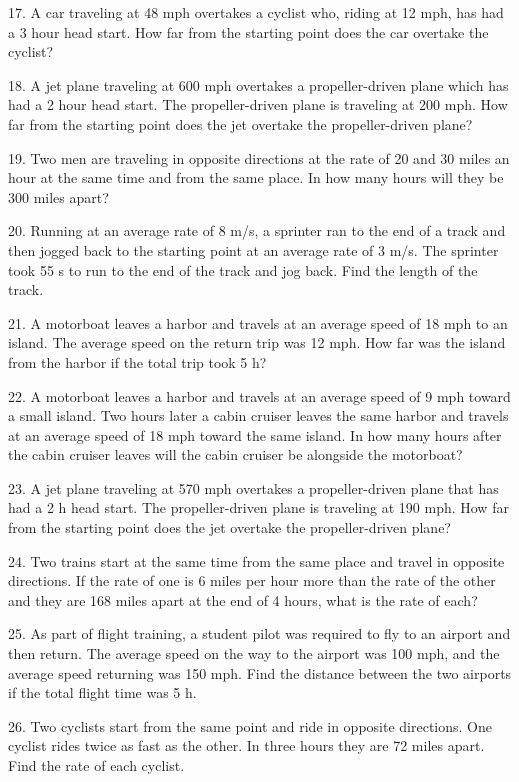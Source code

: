 17. A car traveling at 48 mph overtakes a cyclist who, riding at 12 mph, has
had a 3 hour head start. How far from the starting point does
the car overtake the cyclist?

18. A jet plane traveling at 600 mph overtakes a propeller-driven plane which
has had a 2 hour head start. The propeller-driven plane is
traveling at 200 mph. How far from the starting point does the
jet overtake the propeller-driven plane?

19. Two men are traveling in opposite directions at the rate of 20 and 30
miles an hour at the same time and from the same place. In how
many hours will they be 300 miles apart?

20. Running at an average rate of 8 m/s, a sprinter ran to the end of a track
and then jogged back to the starting point at an average rate of
3 m/s. The sprinter took 55 s to run to the end of
the track and jog back. Find the length of the
track.

21. A motorboat leaves a harbor and travels at an average speed of 18 mph to
an island. The average speed on the return trip was 12 mph. How
far was the island from the harbor if the total trip took
5 h?

22. A motorboat leaves a harbor and travels at an average speed of 9 mph
toward a small island. Two hours later a cabin cruiser leaves the
same harbor and travels at an average speed of 18 mph
toward the same island. In how many hours after the cabin
cruiser leaves will the cabin cruiser be alongside the motorboat?

\pagebreak

23. A jet plane traveling at 570 mph overtakes a propeller-driven plane that
has had a 2 h head start. The propeller-driven plane is
traveling at 190 mph. How far from the starting point
does the jet overtake the propeller-driven plane?

24. Two trains start at the same time from the same place and travel in
opposite directions. If the rate of one is 6 miles per hour more
than the rate of the other and they are 168 miles apart
at the end of 4 hours, what is the rate of each?

25. As part of flight training, a student pilot was required to fly to an
airport and then return. The average speed on the way to the
airport was 100 mph, and the average speed returning was 150
mph. Find the distance between the two airports if the total
flight time was 5 h.

26. Two cyclists start from the same point and ride in opposite directions.
One cyclist rides twice as fast as the other. In three
hours they are 72 miles apart. Find the rate of each cyclist.

